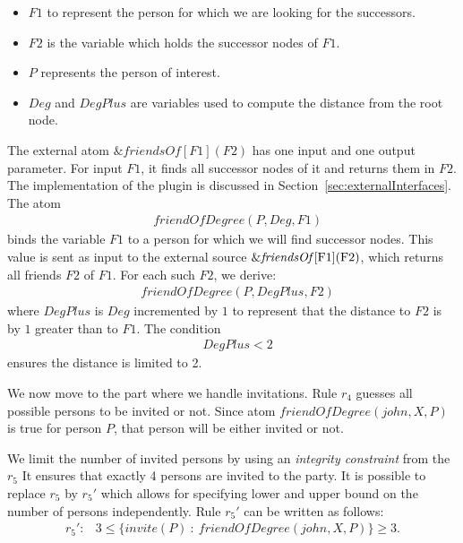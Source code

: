 \documentclass[a4paper, titlepage]{article}
\newcommand{\ext}[3]{\ensuremath{\&{#1}[#2](#3)}}
\begin{document}
\begin{itemize}
\item $\mathit{F1}$ to represent the person for which we are 
looking for the successors.

\item $\mathit{F2}$ is the variable which holds the successor 
nodes of $F1$. 

\item $P$ represents the person of interest.

\item $\mathit{Deg}$ and $DegPlus$ are variables used to 
compute the distance from the root node.
\end{itemize}
The external atom \ext{friendsOf}{F1}{F2} has one input and 
one output parameter. For input $\mathit{F1}$, 
it finds all successor nodes of it and returns them in 
$\mathit{F2}$. The implementation of the plugin is 
discussed in Section~\ref{sec:externalInterfaces}. The atom
\begin{align*}
& \mathit{friendOfDegree(P, Deg, F1)}
\end{align*}
binds the variable $\mathit{F1}$ to a person for which we 
will find successor nodes. This value is sent as input to 
the external source \ext{\mathit{friendsOf}}{$F1$}{$F2$}, 
which returns all friends $F2$ of $F1$. For each such $F2$, 
we derive:
\begin{align*}
& \mathit{friendOfDegree(P, DegPlus, F2)}
\end{align*} 
where $\mathit{DegPlus}$ is $\mathit{Deg}$ incremented by 
$1$ to represent that the distance to $F2$ is by $1$ 
greater than to $F1$. The condition
\begin{align*}
& \mathit{DegPlus < 2}
\end{align*}
ensures the distance is limited to 2. 

We now move to the part where we handle invitations. Rule $r_4$ guesses all possible 
persons to be invited or not. Since atom 
$\mathit{friendOfDegree(john, X, P)}$ is true for person $P$, that person will be either invited or not.

We limit the number of invited persons by using an 
\emph{integrity constraint} from the $r_5$
It ensures that exactly 4 persons are invited to the party. 
It is possible to replace $r_5$ by $r_5 \prime $ which allows for specifying 
lower and upper bound on the number of persons independently. Rule $r_5 \prime $ can be written as follows:
\begin{align*}
r_5 \prime  \colon & 3 \leq \{ invite(P) \ \colon \ friendOfDegree(john,X,P)\} \geq 3.
\end{align*} 
  
\end{document}
